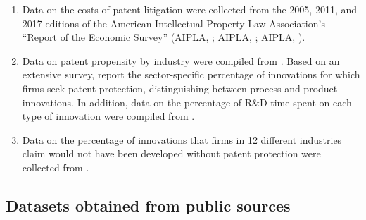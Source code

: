 \documentclass[a4paper,11pt]{article}
\begin{document}
\begin{enumerate}[(1)]
\item \label{s:aipla} Data on the costs of patent litigation were collected from the 2005, 2011, and 2017 editions of the American Intellectual Property Law Association's ``Report of the Economic Survey'' (AIPLA, \citeyear{AIPLA05}; AIPLA, \citeyear{AIPLA11}; AIPLA, \citeyear{AIPLA17}).

\item \label{s:propensity} Data on patent propensity by industry were compiled from \citet{CoNW00}. Based on an extensive survey, \citet{CoNW00} report the sector-specific percentage of innovations for which firms seek patent protection, distinguishing between process and product innovations. In addition, data on the percentage of R\&D time spent on each type of innovation were compiled from \citet{ArK98}.

\item \label{s:mansfield} Data on the percentage of innovations that firms in 12 different industries claim would not have been developed without patent protection were collected from \citet{Ma86}.
\end{enumerate}


\subsection{Datasets obtained from public sources}
\end{document}
